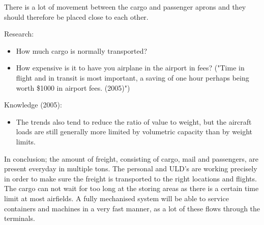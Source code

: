 There is a lot of movement between the cargo and passenger aprons and they should therefore be placed close to each other.%

Research:
\begin{itemize}
\item How much cargo is normally transported?
\item How expensive is it to have you airplane in the airport in fees? ("Time in flight and in transit is most important, a saving of one hour perhaps being worth \$1000 in airport fees. (2005)")
\end{itemize}


Knowledge (2005):
\begin{itemize}
\item The trends also tend to reduce the ratio of value to weight, but the aircraft loads are still generally more limited by volumetric capacity than by weight limits.
\end{itemize}

In conclusion; the amount of freight, consisting of cargo, mail and passengers, are present everyday in multiple tons. The personal and ULD's are working precisely  in order to make sure the freight is transported to the right locations and flights. The cargo can not wait for too long at the storing areas as there is a certain time limit at  most airfields. A fully mechanised system will be able to service containers and machines in a very fast manner, as a lot of these flows through the terminals.
